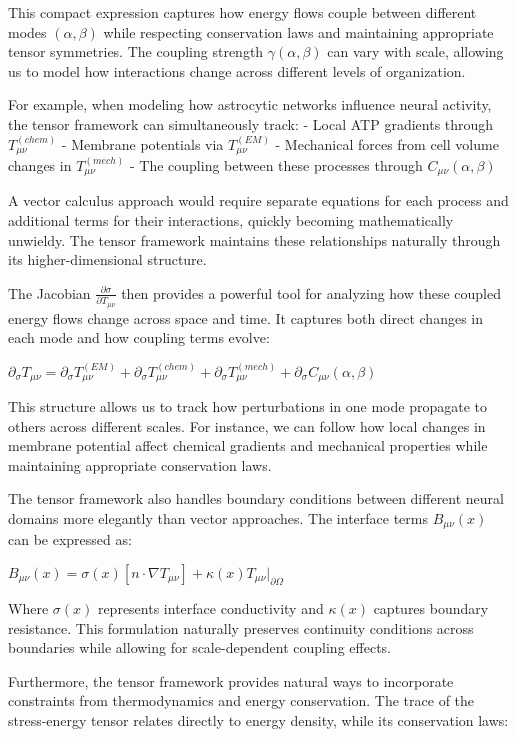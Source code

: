 \begin{refsection}
This compact expression captures how energy flows couple between different modes $(\alpha,\beta)$ while respecting conservation laws and maintaining appropriate tensor symmetries. The coupling strength $\gamma(\alpha,\beta)$ can vary with scale, allowing us to model how interactions change across different levels of organization.

For example, when modeling how astrocytic networks influence neural activity, the tensor framework can simultaneously track:
- Local ATP gradients through $T^{(chem)}_{\mu\nu}$
- Membrane potentials via $T^{(EM)}_{\mu\nu}$
- Mechanical forces from cell volume changes in $T^{(mech)}_{\mu\nu}$
- The coupling between these processes through $C_{\mu\nu}(\alpha,\beta)$

A vector calculus approach would require separate equations for each process and additional terms for their interactions, quickly becoming mathematically unwieldy. The tensor framework maintains these relationships naturally through its higher-dimensional structure.

The Jacobian $\frac{\partial \sigma}{\partial T_{\mu\nu}}$ then provides a powerful tool for analyzing how these coupled energy flows change across space and time. It captures both direct changes in each mode and how coupling terms evolve:

$\partial_\sigma T_{\mu\nu} = \partial_\sigma T^{(EM)}_{\mu\nu} + \partial_\sigma T^{(chem)}_{\mu\nu} + \partial_\sigma T^{(mech)}_{\mu\nu} + \partial_\sigma C_{\mu\nu}(\alpha,\beta)$

This structure allows us to track how perturbations in one mode propagate to others across different scales. For instance, we can follow how local changes in membrane potential affect chemical gradients and mechanical properties while maintaining appropriate conservation laws.

The tensor framework also handles boundary conditions between different neural domains more elegantly than vector approaches. The interface terms $B_{\mu\nu}(x)$ can be expressed as:

$B_{\mu\nu}(x) = \sigma(x)[n \cdot \nabla T_{\mu\nu}] + \kappa(x)T_{\mu\nu}|_{\partial\Omega}$

Where $\sigma(x)$ represents interface conductivity and $\kappa(x)$ captures boundary resistance. This formulation naturally preserves continuity conditions across boundaries while allowing for scale-dependent coupling effects.

Furthermore, the tensor framework provides natural ways to incorporate constraints from thermodynamics and energy conservation. The trace of the stress-energy tensor relates directly to energy density, while its conservation laws:


\end{refsection}
